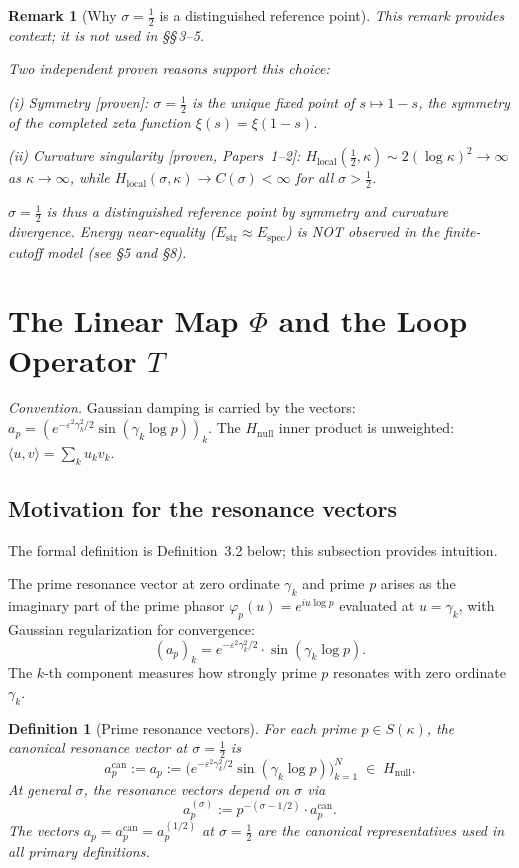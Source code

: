 \documentclass[11pt]{article}
\newtheorem{definition}[theorem]{Definition}
\newtheorem*{remark}{Remark}
\newcommand{\Hnull}{H_{\mathrm{null}}}
\newcommand{\Estr}{E_{\mathrm{str}}}
\newcommand{\Espec}{E_{\mathrm{spec}}}
\newcommand{\acan}{a_p^{\mathrm{can}}}
\newcommand{\Hlocal}{H_{\mathrm{local}}}
\begin{document}
\begin{remark}[Why $\sigma=\tfrac12$ is a distinguished reference point]
\label{rem:half}
This remark provides context; it is not used in \S\S\,3--5.

Two independent proven reasons support this choice:

\emph{(i) Symmetry} [proven]: $\sigma=\tfrac12$ is the unique fixed point of
$s\mapsto 1-s$, the symmetry of the completed zeta function
$\xi(s)=\xi(1-s)$.

\emph{(ii) Curvature singularity} [proven, Papers~1--2]:
$\Hlocal(\tfrac12,\kappa)\sim 2(\log\kappa)^2\to\infty$ as $\kappa\to\infty$,
while $\Hlocal(\sigma,\kappa)\to C(\sigma)<\infty$ for all $\sigma>\tfrac12$.

$\sigma=\tfrac12$ is thus a distinguished reference point by symmetry and
curvature divergence. Energy near-equality ($\Estr\approx\Espec$) is NOT
observed in the finite-cutoff model (see \S5 and \S8).
\end{remark}

\section{The Linear Map $\Phi$ and the Loop Operator $T$}

\emph{Convention.} Gaussian damping is carried by the vectors:
$a_p=(e^{-\varepsilon^2\gamma_k^2/2}\sin(\gamma_k\log p))_k$.
The $\Hnull$ inner product is unweighted: $\langle u,v\rangle=\sum_k u_kv_k$.

\subsection{Motivation for the resonance vectors}

The formal definition is Definition~3.2 below; this subsection
provides intuition.

The prime resonance vector at zero ordinate $\gamma_k$ and prime $p$ arises as
the imaginary part of the prime phasor $\varphi_p(u)=e^{iu\log p}$ evaluated
at $u=\gamma_k$, with Gaussian regularization for convergence:
\[
(a_p)_k = e^{-\varepsilon^2\gamma_k^2/2}\cdot\sin(\gamma_k\log p).
\]
The $k$-th component measures how strongly prime $p$ resonates with zero
ordinate $\gamma_k$.

\begin{definition}[Prime resonance vectors]
For each prime $p\in S(\kappa)$, the \emph{canonical resonance vector}
at $\sigma=\tfrac12$ is
\[
\acan := a_p :=
\bigl(e^{-\varepsilon^2\gamma_k^2/2}\sin(\gamma_k\log p)\bigr)_{k=1}^N
\;\in\;\Hnull.
\]
At general $\sigma$, the resonance vectors depend on $\sigma$ via
\[
a_p^{(\sigma)} := p^{-(\sigma-1/2)}\cdot\acan.
\]
The vectors $a_p=\acan=a_p^{(1/2)}$ at $\sigma=\tfrac12$ are the
canonical representatives used in all primary definitions.
\end{definition}
\end{document}
